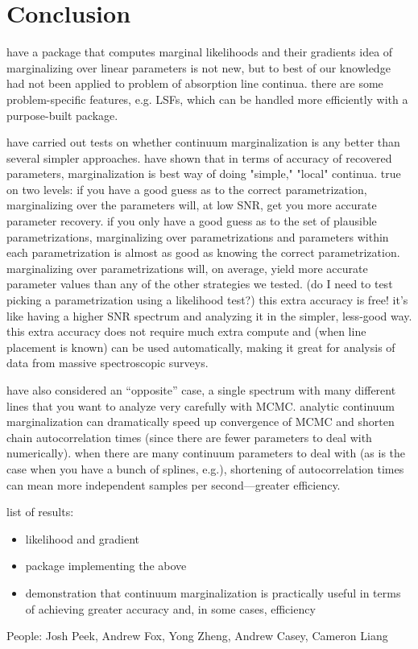 \documentclass[manuscript]{aastex62}
\begin{document}
\section{Conclusion}
\label{sec:conclusion}
have a package that computes marginal likelihoods and their gradients
idea of marginalizing over linear parameters is not new, but to best of our knowledge had not been applied to problem of absorption line continua.
there are some problem-specific features, e.g. LSFs, which can be handled more efficiently with a purpose-built package.

have carried out tests on whether continuum marginalization is any better than several simpler approaches.
 have shown that in terms of accuracy of recovered parameters, marginalization is best way of doing "simple," "local" continua.
true on two levels: if you have a good guess as to the correct parametrization, marginalizing over the parameters will, at low SNR, get you more accurate parameter recovery.
if you only have a good guess as to the set of plausible parametrizations, marginalizing over parametrizations and parameters within each parametrization is almost as good as knowing the correct parametrization.
marginalizing over parametrizations will, on average, yield more accurate parameter values than any of the other strategies we tested. (do I need to test picking a parametrization using a likelihood test?)
this extra accuracy is free! it's like having a higher SNR spectrum and analyzing it in the simpler, less-good way.
this extra accuracy does not require much extra compute and (when line placement is known) can be used automatically, making it great for analysis of data from massive spectroscopic surveys.

have also considered an ``opposite'' case, a single spectrum with many different lines that you want to analyze very carefully with MCMC.
analytic continuum marginalization can dramatically speed up convergence of MCMC and shorten chain autocorrelation times (since there are fewer parameters to deal with numerically).
when there are many continuum parameters to deal with (as is the case when you have a bunch of splines, e.g.), shortening of autocorrelation times can mean more independent samples per second---greater efficiency.

list of results:
\begin{itemize}
  \item likelihood and gradient
  \item package implementing the above
  \item demonstration that continuum marginalization is practically useful in terms of achieving greater accuracy and, in some cases, efficiency
\end{itemize}

\acknowledgments People: Josh Peek, Andrew Fox, Yong Zheng, Andrew Casey, Cameron Liang



\end{document}
